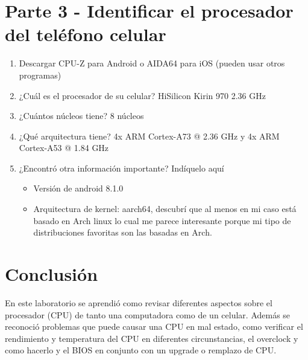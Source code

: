 \documentclass[stu, 12pt, letterpaper, donotrepeattitle, floatsintext, natbib, helv]{apa7}
\begin{document}
\section*{Parte 3 - Identificar el procesador del teléfono celular}
{}

\begin{enumerate}
    \item Descargar CPU-Z para Android o AIDA64 para iOS (pueden usar otros programas)
    \item ¿Cuál es el procesador de su celular? HiSilicon Kirin 970 2.36 GHz
    \item ¿Cuántos núcleos tiene? 8 núcleos
    \item ¿Qué arquitectura tiene? 4x ARM Cortex-A73 @ 2.36 GHz y 4x ARM Cortex-A53 @ 1.84 GHz
    \item ¿Encontró otra información importante? Indíquelo aquí
    \begin{itemize}
        \item Versión de android 8.1.0
        \item Arquitectura de kernel: aarch64, descubrí que al menos en mi caso está basado en Arch linux lo cual me parece interesante porque mi tipo de distribuciones favoritas son las basadas en Arch.
    \end{itemize}
\end{enumerate}

\section*{Conclusión}
{}
En este laboratorio se aprendió como revisar diferentes aspectos sobre el procesador (CPU) de tanto una computadora como de un celular. Además se reconoció problemas que puede causar una CPU en mal estado, como verificar el rendimiento y temperatura del CPU en diferentes circunstancias, el overclock y como hacerlo y el BIOS en conjunto con un upgrade o remplazo de CPU.

\newpage
\renewcommand\refname{\large\textbf{Referencias}}

\end{document}

